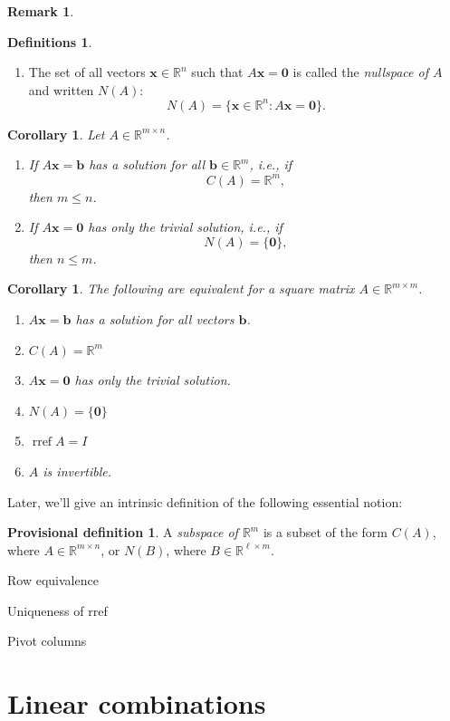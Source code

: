 \documentclass[12pt]{amsart}
\newcommand{\RR}{\mathbb{R}}
\DeclareMathOperator{\rref}{rref}
\newtheorem{corollary}[theorem]{Corollary} \newtheorem{lemma}[theorem]{Lemma}
\theoremstyle{definition} \newtheorem{definition}[theorem]{Definition}
\newtheorem{provdef}[theorem]{Provisional definition}
\newtheorem{definitions}[theorem]{Definitions}
\newtheorem{remark}[theorem]{Remark} \newtheorem{remarks}[theorem]{Remarks}
\newcommand{\bb}{\mathbf{b}}
\newcommand{\bx}{\mathbf{x}}
\newcommand{\bzero}{\mathbf{0}}
\begin{document}
\begin{remark}
\begin{definitions}
\begin{enumerate}
		\item The set of all vectors $\bx\in\RR^n$ such that
		$A\bx=\bzero$ is called the \emph{nullspace of $A$} and written
$N(A)$: \[ N(A) = \{\bx\in\RR^n : A\bx=\bzero\}.  \]\end{enumerate} \end{definitions}

\begin{corollary} Let $A\in\RR^{m\times n}$.  \begin{enumerate} \item If
	$A\bx=\bb$ has a solution for all $\bb\in\RR^m$, i.e., if
	$$C(A)=\RR^m,$$ then $m\leq n$.  \item If $A\bx=\bzero$ has only the
	trivial solution, i.e., if $$N(A)=\{\bzero\},$$ then $n\leq m$.
	\end{enumerate} \end{corollary}

\begin{corollary} The following are equivalent for a square matrix
	$A\in\RR^{m\times m}$.  \begin{enumerate} \item $A\bx=\bb$ has a
		solution for all vectors $\bb$.  \item $C(A)=\RR^m$ \item
		$A\bx=\bzero$ has only the trivial solution.  \item
		$N(A)=\{\bzero\}$ \item $\rref A = I$ \item $A$ is invertible.
\end{enumerate} \end{corollary}

Later, we'll give an intrinsic definition of the following essential notion:
\begin{provdef} A \emph{subspace of $\RR^m$} is a subset of the form $C(A)$,
where $A\in\RR^{m\times n}$, or $N(B)$, where $B\in\RR^{\ell\times m}$.
\end{provdef}

Row equivalence

Uniqueness of rref

Pivot columns


\section{Linear combinations}


\end{remark}
\end{document}
